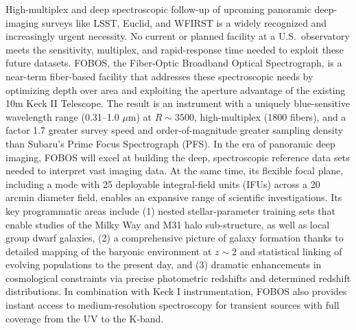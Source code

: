 \documentclass[oneside,12pt]{amsart}
\begin{document}
\noindent High-multiplex and deep spectroscopic follow-up of upcoming
panoramic deep-imaging surveys like LSST, Euclid, and WFIRST is a widely recognized and increasingly urgent necessity.
No current or planned facility at a U.S.~observatory meets the sensitivity, multiplex, and rapid-response time needed
to exploit these future datasets. FOBOS, the Fiber-Optic Broadband Optical Spectrograph, is a near-term fiber-based
facility that addresses these spectroscopic needs by optimizing depth over area and exploiting the aperture advantage
of the existing 10m Keck II Telescope. The result is an instrument with a uniquely blue-sensitive wavelength range
(0.31--1.0 $\mu$m) at $R \sim 3500$, high-multiplex (1800 fibers), and a factor 1.7 greater survey speed and
order-of-magnitude greater sampling density than Subaru's Prime Focus Spectrograph (PFS). In the era of panoramic deep
imaging, FOBOS will excel at building the deep, spectroscopic reference data sets needed to interpret vast imaging
data. At the same time, its flexible focal plane, including a mode with 25 deployable integral-field units (IFUs)
across a 20 arcmin diameter field, enables an expansive range of scientific investigations. Its key programmatic areas
include (1) nested stellar-parameter training sets that enable studies of the Milky Way and M31 halo sub-structure, as
well as local group dwarf galaxies, (2) a comprehensive picture of galaxy formation thanks to detailed mapping of the
baryonic environment at $z \sim 2$ and statistical linking of evolving populations to the present day, and (3) dramatic
enhancements in cosmological constraints via precise photometric redshifts and determined redshift distributions.  In
combination with Keck I instrumentation, FOBOS also provides instant access to medium-resolution spectroscopy for
transient sources with full coverage from the UV to the K-band.

\pagebreak















\clearpage
\begin{multicols}{2}
\scriptsize


\end{multicols}

\end{document}

